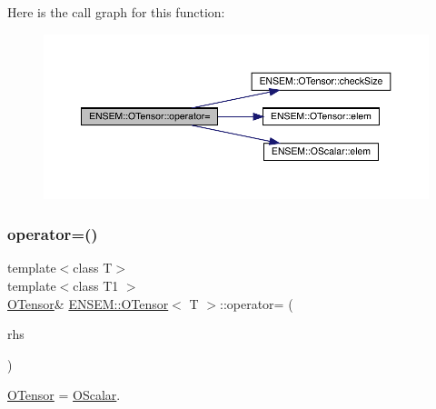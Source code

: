 Here is the call graph for this function\+:
\nopagebreak
\begin{figure}[H]
\begin{center}
\leavevmode
\includegraphics[width=350pt]{da/d8a/classENSEM_1_1OTensor_ae763ca68be1d6b8d5b27b8d544ab5f2d_cgraph}
\end{center}
\end{figure}
\mbox{\label{classENSEM_1_1OTensor_ae763ca68be1d6b8d5b27b8d544ab5f2d}} 
\subsubsection{\texorpdfstring{operator=()}{operator=()}\hspace{0.1cm}{\footnotesize\ttfamily [5/12]}}
{\footnotesize\ttfamily template$<$class T$>$ \\
template$<$class T1 $>$ \\
\mbox{\hyperlink{classENSEM_1_1OTensor}{O\+Tensor}}\& \mbox{\hyperlink{classENSEM_1_1OTensor}{E\+N\+S\+E\+M\+::\+O\+Tensor}}$<$ T $>$\+::operator= (\begin{DoxyParamCaption}\item[{const \mbox{\hyperlink{classENSEM_1_1OScalar}{O\+Scalar}}$<$ T1 $>$ \&}]{rhs }\end{DoxyParamCaption})\hspace{0.3cm}{\ttfamily [inline]}}



\mbox{\hyperlink{classENSEM_1_1OTensor}{O\+Tensor}} = \mbox{\hyperlink{classENSEM_1_1OScalar}{O\+Scalar}}. 

